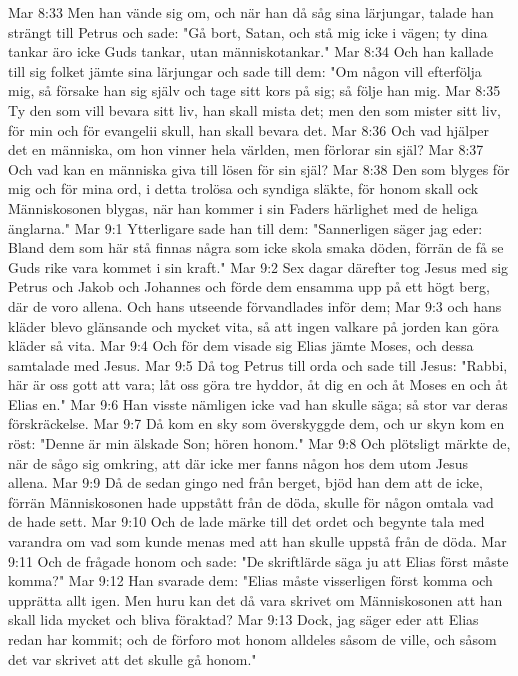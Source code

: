 Mar 8:33  Men han vände sig om, och när han då såg sina lärjungar, talade han strängt till Petrus och sade: "Gå bort, Satan, och stå mig icke i vägen; ty dina tankar äro icke Guds tankar, utan människotankar."
Mar 8:34  Och han kallade till sig folket jämte sina lärjungar och sade till dem: "Om någon vill efterfölja mig, så försake han sig själv och tage sitt kors på sig; så följe han mig.
Mar 8:35  Ty den som vill bevara sitt liv, han skall mista det; men den som mister sitt liv, för min och för evangelii skull, han skall bevara det.
Mar 8:36  Och vad hjälper det en människa, om hon vinner hela världen, men förlorar sin själ?
Mar 8:37  Och vad kan en människa giva till lösen för sin själ?
Mar 8:38  Den som blyges för mig och för mina ord, i detta trolösa och syndiga släkte, för honom skall ock Människosonen blygas, när han kommer i sin Faders härlighet med de heliga änglarna."
Mar 9:1  Ytterligare sade han till dem: "Sannerligen säger jag eder: Bland dem som här stå finnas några som icke skola smaka döden, förrän de få se Guds rike vara kommet i sin kraft."
Mar 9:2  Sex dagar därefter tog Jesus med sig Petrus och Jakob och Johannes och förde dem ensamma upp på ett högt berg, där de voro allena. Och hans utseende förvandlades inför dem;
Mar 9:3  och hans kläder blevo glänsande och mycket vita, så att ingen valkare på jorden kan göra kläder så vita.
Mar 9:4  Och för dem visade sig Elias jämte Moses, och dessa samtalade med Jesus.
Mar 9:5  Då tog Petrus till orda och sade till Jesus: "Rabbi, här är oss gott att vara; låt oss göra tre hyddor, åt dig en och åt Moses en och åt Elias en."
Mar 9:6  Han visste nämligen icke vad han skulle säga; så stor var deras förskräckelse.
Mar 9:7  Då kom en sky som överskyggde dem, och ur skyn kom en röst: "Denne är min älskade Son; hören honom."
Mar 9:8  Och plötsligt märkte de, när de sågo sig omkring, att där icke mer fanns någon hos dem utom Jesus allena.
Mar 9:9  Då de sedan gingo ned från berget, bjöd han dem att de icke, förrän Människosonen hade uppstått från de döda, skulle för någon omtala vad de hade sett.
Mar 9:10  Och de lade märke till det ordet och begynte tala med varandra om vad som kunde menas med att han skulle uppstå från de döda.
Mar 9:11  Och de frågade honom och sade: "De skriftlärde säga ju att Elias först måste komma?"
Mar 9:12  Han svarade dem: "Elias måste visserligen först komma och upprätta allt igen. Men huru kan det då vara skrivet om Människosonen att han skall lida mycket och bliva föraktad?
Mar 9:13  Dock, jag säger eder att Elias redan har kommit; och de förforo mot honom alldeles såsom de ville, och såsom det var skrivet att det skulle gå honom."
